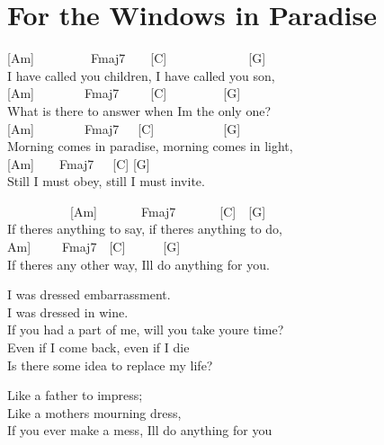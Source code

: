 \documentclass[
  letterpaper,
  a5paper]{memoir}
\begin{document}
\hypertarget{for-the-windows-in-paradise}{%
\chapter{For the Windows in
Paradise}\label{for-the-windows-in-paradise}}

{[}Am{]}~~~~~~~~~Fmaj7~~~~{[}C{]}~~~~~~~~~~~~~{[}G{]}\\
I have called you children, I have called you son,\\
{[}Am{]}~~~~~~~~Fmaj7~~~~~{[}C{]}~~~~~~~~~{[}G{]}\\
What is there to answer when I\textquotesingle m the only one?\\
{[}Am{]}~~~~~~~~Fmaj7~~~{[}C{]}~~~~~~~~~~~{[}G{]}\\
Morning comes in paradise, morning comes in light,\\
{[}Am{]}~~~~Fmaj7~~~{[}C{]} {[}G{]}\\
Still I must obey, still I must invite.

~~~~~~~~~~{[}Am{]}~~~~~~~Fmaj7~~~~~~~{[}C{]}~~{[}G{]}\\
If there\textquotesingle s anything to say, if there\textquotesingle s
anything to do,\\
\hspace*{0.333em}\hspace*{0.333em}\hspace*{0.333em}\hspace*{0.333em}\hspace*{0.333em}\hspace*{0.333em}\hspace*{0.333em}\hspace*{0.333em}\hspace*{0.333em}\hspace*{0.333em}{[}Am{]}~~~~~Fmaj7~~{[}C{]}~~~~~~{[}G{]}\\
If there\textquotesingle s any other way, I\textquotesingle ll do
anything for you.

I was dressed embarrassment.\\
I was dressed in wine.\\
If you had a part of me, will you take you\textquotesingle re time?\\
Even if I come back, even if I die\\
Is there some idea to replace my life?

Like a father to impress;\\
Like a mother\textquotesingle s mourning dress,\\
If you ever make a mess, I\textquotesingle ll do anything for you
\end{document}

